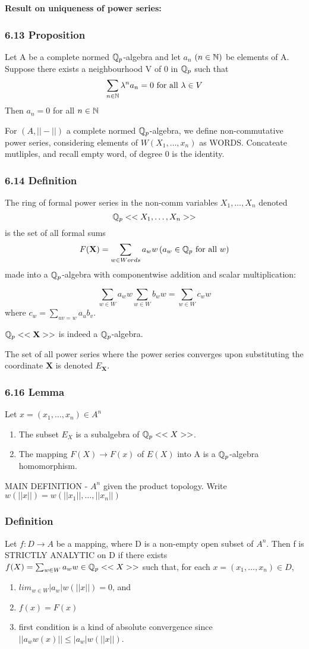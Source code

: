 \textbf{Result on uniqueness of power series:}

\subsubsection*{6.13 Proposition}
Let A be a complete normed $\mathbb Q_p$-algebra and let $a_n$ $(n\in\mathbb N)$ be elements of A. Suppose there exists a neighbourhood V of 0 in $\mathbb Q_p$ such that 
$$\sum_{n\in \mathbb N} \lambda^n a_n = 0 \text{ for all } \lambda\in V$$
Then $a_n = 0$ for all $n\in \mathbb N$

For $(A,||-||)$ a complete normed $\mathbb Q_p$-algebra, we define non-commutative power series, considering elements of $W(X_1,\dots, x_n)$ as WORDS. Concateate mutliples, and recall empty word, of degree 0 is the identity.

\subsubsection*{ 6.14 Definition}
The ring of formal power series in the non-comm variables $X_1, \dots , X_n$ denoted
$$\mathbb Q_p<<X_1, \dots , X_n>>$$
is the set of all formal sums
$$F(\mathbf{X}) = \sum_{w\in Words}a_ww\,(a_w\in \mathbb Q_p \text{ for all } w)$$
made into a $\mathbb Q_p$-algebra with componentwise addition and scalar multiplication:

$$\sum_{w\in W}a_w w \sum_{w\in W} b_w w = \sum_{w\in W} c_w w $$
where $c_w = \sum_{uv=w}a_u b_v$.

$\mathbb Q_p <<\mathbf X >>$ is indeed a $\mathbb Q_p$-algebra.

The set of all power series where the power series converges upon substituting the coordinate $\mathbf X$ is denoted $E_{\mathbf X}$.

\subsubsection*{6.16 Lemma}
Let $x= (x_1,\dots , x_n)\in A^n$
\begin{enumerate}
\item The subset $E_X$ is a subalgebra of $\mathbb Q_p<<X>>$.
\item The mapping $F(X)\rightarrow F(x)$ of $E(X)$ into A is a $\mathbb Q_p$-algebra homomorphism.
\end{enumerate}

MAIN DEFINITION - $A^n$ given the product topology. Write $w(||x||) = w(||x_1||,\dots , ||x_n||)$

\subsubsection*{Definition}
Let $f:D\rightarrow A$ be a mapping, where D is a non-empty open subset of $A^n$. Then f is STRICTLY ANALYTIC on D if there exists $f(X) = \sum_{w\in W}a_w w\in \mathbb Q_p<<X>>$ such that, for each $x=(x_1,\dots , x_n)\in D$,
\begin{enumerate}
\item $lim_{w\in W} |a_w| w(||x||) = 0$, and
\item $f(x) = F(x)$
\item first condition is a kind of absolute convergence since $||a_w w(x)||\leq |a_w| w(||x||)$.
\end{enumerate}

